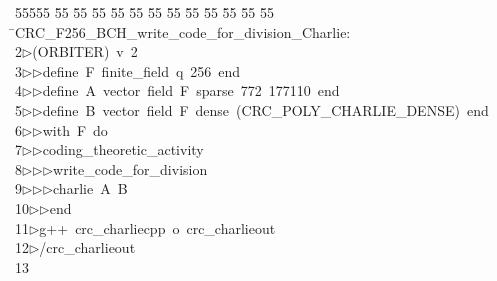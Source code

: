 %
%
\begin{tabbing}
55555 \= 55 \= 55 \= 55 \= 55 \= 55 \= 55 \= 55 \= 55 \= 55 \= 55 \= 55 \= 55 \= \>CRC\_F256\_BCH\_write\_code\_for\_division\_Charlie:\\[0pt]
2\>$\triangleright$\>(ORBITER)\ v\ 2\ \\[0pt]
3\>$\triangleright$\>$\triangleright$\>define\ F\ finite\_field\ q\ 256\ end\ \\[0pt]
4\>$\triangleright$\>$\triangleright$\>define\ A\ vector\ field\ F\ sparse\ 772\ 177110\ end\ \\[0pt]
5\>$\triangleright$\>$\triangleright$\>define\ B\ vector\ field\ F\ dense\ (CRC\_POLY\_CHARLIE\_DENSE)\ end\ \\[0pt]
6\>$\triangleright$\>$\triangleright$\>with\ F\ do\ \\[0pt]
7\>$\triangleright$\>$\triangleright$\>coding\_theoretic\_activity\ \\[0pt]
8\>$\triangleright$\>$\triangleright$\>$\triangleright$\>write\_code\_for\_division\ \\[0pt]
9\>$\triangleright$\>$\triangleright$\>$\triangleright$\>charlie\ A\ B\ \\[0pt]
10\>$\triangleright$\>$\triangleright$\>end\\[0pt]
11\>$\triangleright$\>g++\ crc\_charliecpp\ o\ crc\_charlieout\\[0pt]
12\>$\triangleright$\>/crc\_charlieout\\[0pt]
13\>\end{tabbing}
